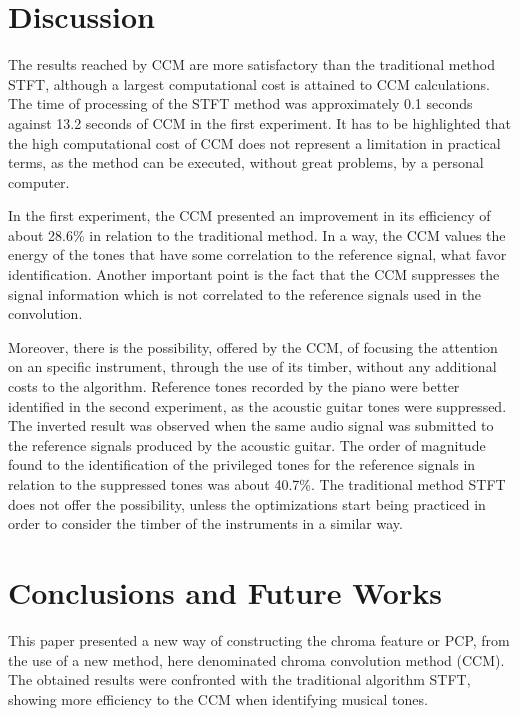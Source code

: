 \documentclass{article}
\begin{document}
\section{Discussion}\label{sec:discussion}

	The results reached by CCM are more satisfactory than the traditional method STFT, although a largest computational cost is attained to CCM calculations. The time of processing of the STFT method was approximately 0.1 seconds against 13.2 seconds of CCM in the first experiment. It has to be highlighted that the high computational cost of CCM does not represent a limitation in practical terms, as the method can be executed, without great problems, by a personal computer.

	In the first experiment, the CCM presented an improvement in its efficiency of about 28.6\% in relation to the traditional method. In a way, the CCM values the energy of the tones that have some correlation to the reference signal, what favor identification. Another important point is the fact that the CCM suppresses the signal information which is not correlated to the reference signals used in the convolution.

	Moreover, there is the possibility, offered by the CCM, of focusing the attention on an specific instrument, through the use of its timber, without any additional costs to the algorithm. Reference tones recorded by the piano were better identified in the second experiment, as the acoustic guitar tones were suppressed. The inverted result was observed when the same audio signal was submitted to the reference signals produced by the acoustic guitar. The order of magnitude found to the identification of the privileged tones for the reference signals in relation to the suppressed tones was about 40.7\%. The traditional method STFT does not offer the possibility, unless the optimizations start being practiced in order to consider the timber of the instruments in a similar way.


	\section{Conclusions and Future Works}\label{sec:conclusions}

	This paper presented a new way of constructing the chroma feature or PCP, from the use of a new method, here denominated chroma convolution method (CCM). The obtained results were confronted with the traditional algorithm STFT, showing more efficiency to the CCM when identifying musical tones.
\end{document}
